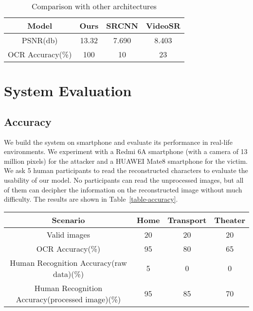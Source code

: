 \begin{table}  
\begin{tabular}{c|c|c|c} 
Model & Ours & SRCNN & VideoSR \\ \hline
PSNR(db) & 13.32 & 7.690 & 8.403 \\ \hline
OCR Accuracy(\%) & 100 & 10 & 23 \\
\end{tabular} 
\caption{Comparison with other architectures}
\label{table-comp}
\end{table}

\section{System Evaluation}
\subsection{Accuracy}
We build the system on smartphone and evaluate its performance in real-life environments. We experiment with a Redmi 6A smartphone (with a camera of 13 million pixels) for the attacker and a HUAWEI Mate8 smartphone for the victim. We ask 5 human participants to read the reconstructed characters to evaluate the usability of our model. No participants can read the unprocessed images, but all of them can decipher the information on the reconstructed image without much difficulty. The results are shown in Table~\ref{table-accuracy}.

\begin{table*}  
\begin{tabular}{c|c|c|c} 
Scenario & Home & Transport & Theater\\ \hline
Valid images & 20 & 20 & 20\\ \hline
OCR Accuracy(\%) & 95 & 80 & 65\\ \hline
Human Recognition Accuracy(raw data)(\%) & 5 & 0 & 0\\ \hline
Human Recognition Accuracy(processed image)(\%) & 95 & 85 & 70 \\
\end{tabular} 
\caption{Accuracy in different real-life scenarios}
\label{table-accuracy}
\end{table*}

